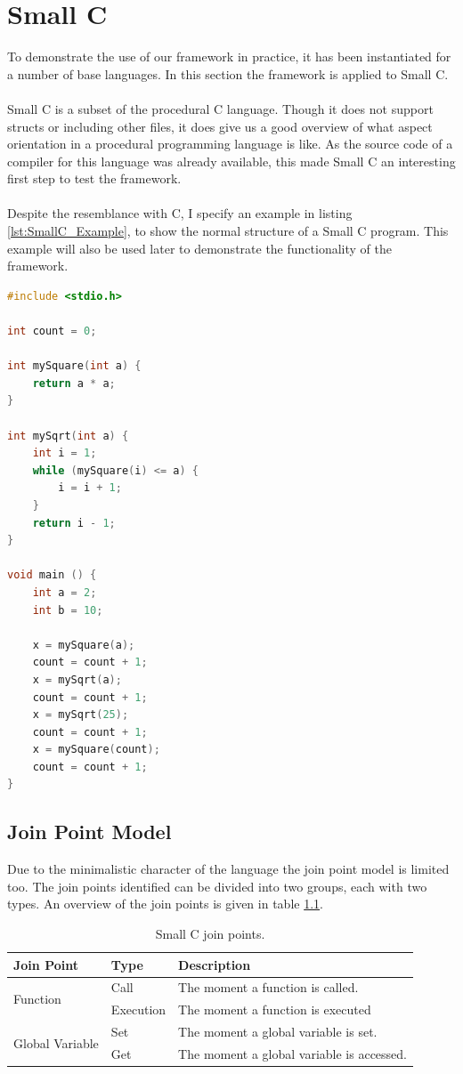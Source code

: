 \documentclass[a4paper]{report}
\begin{document}
\chapter{Small C}
\label{chap:SmallC}
To demonstrate the use of our framework in practice, it has been instantiated for a number of base languages. In this section the framework is applied to Small C.\\
\\
Small C is a subset of the procedural C language. Though it does not support structs or including other files, it does give us a good overview of what aspect orientation in a procedural programming language is like. As the source code of a compiler for this language was already available, this made Small C an interesting first step to test the framework.\\
\\
Despite the resemblance with C, I specify an example in listing \ref{lst:SmallC_Example}, to show the normal structure of a Small C program. This example will also be used later to demonstrate the functionality of the framework.
\begin{lstlisting}[language=C, multicols=2, caption=A simple Small C program., label=lst:SmallC_Example]
#include <stdio.h>

int count = 0;

int mySquare(int a) {
	return a * a;
}

int mySqrt(int a) {
	int i = 1;
	while (mySquare(i) <= a) {
		i = i + 1;
	}	
	return i - 1;
}

void main () {
	int a = 2;
	int b = 10;
	
	x = mySquare(a);
	count = count + 1;
	x = mySqrt(a);
	count = count + 1;
	x = mySqrt(25);
	count = count + 1;
	x = mySquare(count);
	count = count + 1;
}
\end{lstlisting}

\section{Join Point Model}
Due to the minimalistic character of the language the join point model is limited too. The join points identified can be divided into two groups, each with two types. An overview of the join points is given in table \ref{tab:SmallC_JoinPoints}.
\begin{table}[h!]
\centering
\begin{tabular}{|l|l|l|}
\hline
Join Point & Type & Description\\
\hline
\multirow{2}{*}{Function} & Call & The moment a function is called.\\
& Execution & The moment a function is executed\\
\hline
\multirow{2}{*}{Global Variable} & Set & The moment a global variable is set.\\
& Get & The moment a global variable is accessed.\\
\hline
\end{tabular}
\caption{Small C join points.}
\label{tab:SmallC_JoinPoints}
\end{table}
\end{document}
